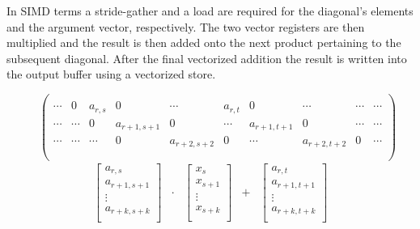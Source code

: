       In SIMD terms a stride-gather and a load are required for the diagonal's elements and the argument vector, respectively. The two vector registers are then multiplied and the result is then added onto the next product pertaining to the subsequent diagonal. After the final vectorized addition the result is written into the output buffer using a vectorized store.

      \begin{figure}[ht]
        \centering
        $$
        \begin{pmatrix}
          \\
          \cdots & 0 & a_{r,s} & 0 & \cdots & a_{r,t} & 0 & \cdots & \cdots & \cdots \\
          \cdots & \cdots & 0 & a_{r+1,s+1} & 0 & \cdots & a_{r+1,t+1} & 0 & \cdots & \cdots \\
          \cdots & \cdots & \cdots & 0 & a_{r+2,s+2} & 0 & \cdots & a_{r+2,t+2} & 0 & \cdots \\
          \\
        \end{pmatrix}
        $$
        $$
        \begin{matrix}
          \begin{bmatrix}
            a_{r,s}     \\
            a_{r+1,s+1} \\
               \vdots   \\
            a_{r+k,s+k} \\
          \end{bmatrix} & \cdot & \begin{bmatrix}
                                    x_s      \\
                                    x_{s+1}  \\
                                      \vdots \\
                                    x_{s+k}  \\
                                  \end{bmatrix} & + & \begin{bmatrix}
                                                      a_{r,t}     \\
                                                      a_{r+1,t+1} \\
                                                        \vdots    \\
                                                      a_{r+k,t+k} \\

\end{bmatrix}
\end{matrix}$$
\end{figure}
